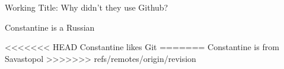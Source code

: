 Working Title: Why didn't they use Github?

Constantine is a Russian

<<<<<<< HEAD
Constantine likes Git
=======
Constantine is from Savastopol
>>>>>>> refs/remotes/origin/revision
